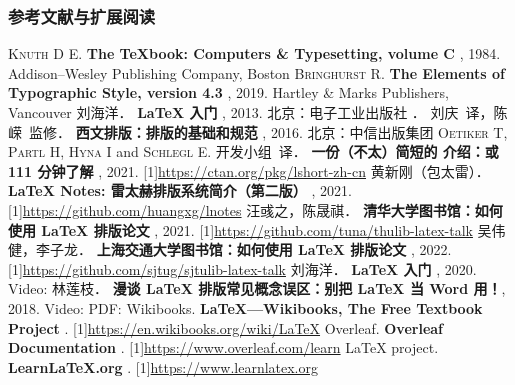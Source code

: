 \begin{frame}[fragile]
\frametitle{参考文献与扩展阅读}
\begin{multicols}{2}
\tiny
\newcommand{\BOOK}[1]{\textbf{#1}}
\newcommand{\TAG}[1]{\CASE{[#1]}}
\newcommand{\URL}[1]{\scalebox{0.92}[1]{\url{#1}}}
\begin{thebibliography}{99}
  \bibitem{}
    \textsc{Knuth D E}.
    \BOOK{The \TeX book: Computers \& Typesetting, volume C} \TAG{M}, 1984.
    \newblock Addison--Wesley Publishing Company, Boston
  \bibitem{}
    \textsc{Bringhurst R}.
    \BOOK{The Elements of Typographic Style, version 4.3} \TAG{M}, 2019.
    \newblock Hartley \& Marks Publishers, Vancouver
  \bibitem{}
    刘海洋．
    \BOOK{\LaTeX{} 入门} \TAG{M}, 2013.
    \newblock 北京：电子工业出版社
  \bibitem{}
    ．
    刘庆~译，陈嵘~监修．
    \BOOK{西文排版：排版的基础和规范} \TAG{M}, 2016.
    \newblock 北京：中信出版集团
  \bibitem{}
    \textsc{Oetiker T}, \textsc{Partl H}, \textsc{Hyna I} and \textsc{Schlegl E}.
    \CTeX{} 开发小组~译．
    \BOOK{一份（不太）简短的 \LaTeXe{} 介绍：或 111 分钟了解 \LaTeXe{}} \TAG{EB/OL}, 2021.
    \newblock \URL{https://ctan.org/pkg/lshort-zh-cn}
  \bibitem{}
    黄新刚（包太雷）．
    \BOOK{\LaTeX{} Notes: 雷太赫排版系统简介（第二版）} \TAG{EB/OL}, 2021.
    \newblock \URL{https://github.com/huangxg/lnotes}
  \bibitem{}
    汪彧之，陈晟祺．
    \BOOK{清华大学图书馆：如何使用 \LaTeX{} 排版论文} \TAG{EB/OL}, 2021.
    \newblock \URL{https://github.com/tuna/thulib-latex-talk}
  \bibitem{}
    吴伟健，李子龙．
    \BOOK{上海交通大学图书馆：如何使用 \LaTeX{} 排版论文} \TAG{EB/OL}, 2022.
    \newblock \URL{https://github.com/sjtug/sjtulib-latex-talk}
  \bibitem{}
    刘海洋．
    \BOOK{\LaTeX{} 入门} \TAG{EB/OL}, 2020.
    \newblock Video: \href{https://www.bilibili.com/video/BV1s7411U7Pr}{\faVideo}
  \bibitem{}
    林莲枝．
    \BOOK{漫谈 \LaTeX{} 排版常见概念误区：别把 \LaTeX{} 当 Word 用！}\TAG{EB/OL}, 2018.
    \newblock Video: \href{https://www.bilibili.com/video/BV1r4411o7KJ}{\faVideo}\quad
      PDF: \href{http://static.latexstudio.net/wp-content/uploads/2018/03/LianTze-presentation-0320-forReading.pdf}{\faDownload}
  \bibitem{}
    Wikibooks.
    \BOOK{\LaTeX{}---Wikibooks, The Free Textbook Project} \TAG{EB/OL}.
    \newblock \URL{https://en.wikibooks.org/wiki/LaTeX}
  \bibitem{}
    Overleaf.
    \BOOK{Overleaf Documentation} \TAG{EB/OL}.
    \newblock \URL{https://www.overleaf.com/learn}
  \bibitem{}
    \LaTeX{} project.
    \BOOK{Learn\LaTeX.org} \TAG{EB/OL}.
    \newblock \URL{https://www.learnlatex.org}
\end{thebibliography}
\end{multicols}
\end{frame}
